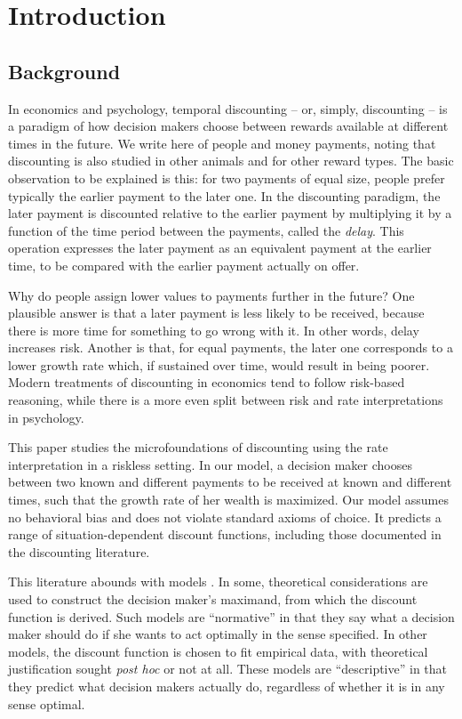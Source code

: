 
\section{Introduction}\label{sec:introduction}

\subsection{Background}\label{sec:background}

In economics and psychology, temporal discounting -- or, simply, discounting -- is a paradigm of how decision makers choose between rewards available at different times in the future. We write here of people and money payments, noting that discounting is also studied in other animals and for other reward types. The basic observation to be explained is this: for two payments of equal size, people prefer typically the earlier payment to the later one. In the discounting paradigm, the later payment is discounted relative to the earlier payment by multiplying it by a function of the time period between the payments, called the \textit{delay}. This operation expresses the later payment as an equivalent payment at the earlier time, to be compared with the earlier payment actually on offer.

Why do people assign lower values to payments further in the future? One plausible answer is that a later payment is less likely to be received, because there is more time for something to go wrong with it. In other words, delay increases risk. Another is that, for equal payments, the later one corresponds to a lower growth rate which, if sustained over time, would result in being poorer. Modern treatments of discounting in economics tend to follow risk-based reasoning, while there is a more even split between risk and rate interpretations in psychology.

This paper studies the microfoundations of discounting using the rate interpretation in a riskless setting. In our model, a decision maker chooses between two known and different payments to be received at known and different times, such that the growth rate of her wealth is maximized. Our model assumes no behavioral bias and does not violate standard axioms of choice. It predicts a range of situation-dependent discount functions, including those documented in the discounting literature.

This literature abounds with models \citep{CohenETAL2019}. In some, theoretical considerations are used to construct the decision maker's maximand, from which the discount function is derived. Such models are ``normative'' in that they say what a decision maker should do if she wants to act optimally in the sense specified. In other models, the discount function is chosen to fit empirical data, with theoretical justification sought {\it post hoc} or not at all. These models are ``descriptive'' in that they predict what decision makers actually do, regardless of whether it is in any sense optimal.

